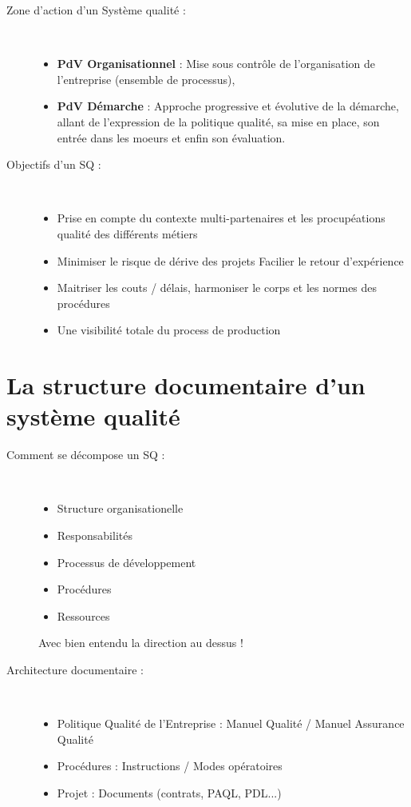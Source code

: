 \begin{description}
	\item[Zone d’action d’un Système qualité :]\hfill\\
	\begin{itemize}
		\item \textbf{PdV Organisationnel} : Mise sous contrôle de l’organisation de l’entreprise (ensemble de processus),
		\item \textbf{PdV Démarche} : Approche progressive et évolutive de la démarche, allant de l’expression de la politique qualité, sa mise en place, son entrée dans les moe{}urs et enfin son évaluation.
	\end{itemize}

	\item[Objectifs d’un SQ :]\hfill\\
	\begin{itemize}
		\item Prise en compte du contexte multi-partenaires et les procupéations qualité des différents métiers
		\item Minimiser le risque de dérive des projets
Facilier le retour d’expérience
		\item Maitriser les couts / délais, harmoniser le corps et les normes des procédures
		\item Une visibilité totale du process de production
	\end{itemize}
\end{description}

\section{La structure documentaire d’un système qualité}

\begin{description}
\item[Comment se décompose un SQ :]\hfill\\
\begin{itemize}
\item Structure organisationelle
\item Responsabilités
\item Processus de développement
\item Procédures 
\item Ressources
\end{itemize}
Avec bien entendu la direction au dessus ! \\

\item[Architecture documentaire :]\hfill\\
\begin{itemize}
\item Politique Qualité de l’Entreprise : Manuel Qualité / Manuel Assurance Qualité
\item Procédures : Instructions / Modes opératoires 
\item Projet : Documents (contrats, PAQL, PDL...)
\end{itemize}
\end{description}

